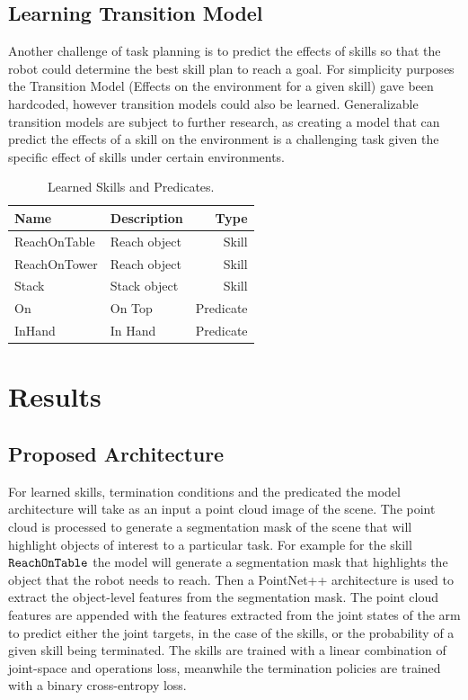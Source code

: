 \documentclass[
	a4paper, %
	10pt, %
	unnumberedsections, %
	twoside, %
]{LTJournalArticle}
\begin{document}
\subsection{Learning Transition Model}
Another challenge of task planning is to predict the effects of skills so that the robot could determine the best skill plan to reach a goal. For simplicity
purposes the Transition Model (Effects on the environment for a given skill) gave been hardcoded, however transition models could also be learned. Generalizable
transition models are subject to further research, as creating a model that can predict the effects of a skill on the environment is a challenging task given the specific
effect of skills under certain environments.


\begin{table}
	\caption{Learned Skills and Predicates.}
	\centering
	\begin{tabular}{l l r}
		\toprule
		\cmidrule(r){1-2}
		Name & Description & Type \\
		\midrule
		ReachOnTable & Reach object & Skill \\
		ReachOnTower & Reach object & Skill \\
		Stack & Stack object & Skill \\
		On & On Top & Predicate \\
		InHand & In Hand & Predicate \\
		\bottomrule
	\end{tabular}
	\label{tab:distcounts}
\end{table}


\section{Results}

\subsection{Proposed Architecture}
For learned skills, termination conditions and the predicated the model architecture will take as an input a point cloud image of the scene.
The point cloud is processed to generate a segmentation mask of the scene that will highlight objects of interest to a particular task. For 
example for the skill \(\verb|ReachOnTable|\) the model will generate a segmentation mask that highlights the object that the robot needs to reach.
Then  a PointNet++ architecture is used to extract the object-level features from the segmentation mask. The point cloud features are appended with
the features extracted from the joint states of the arm to predict either the joint targets, in the case of the skills, or the probability of a given
skill being terminated. The skills are trained with a linear combination of joint-space and operations loss, meanwhile the termination policies are trained
with a binary cross-entropy loss.
\end{document}
